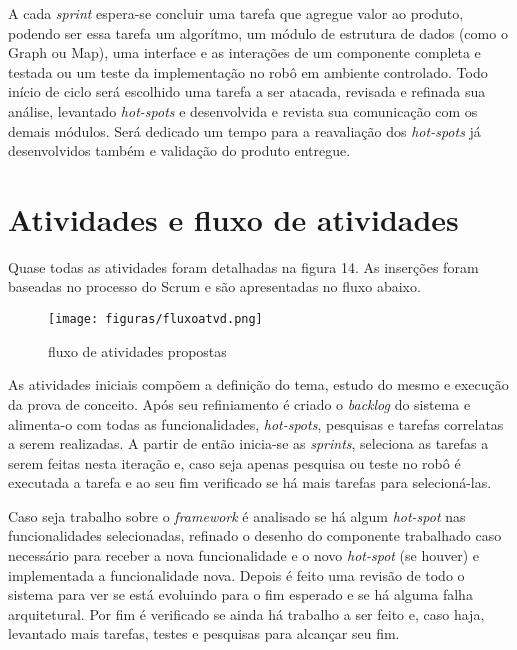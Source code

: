 A cada \textit{sprint} espera-se concluir uma tarefa que agregue valor ao produto, podendo ser essa tarefa um algorítmo, um módulo de estrutura de dados (como o Graph ou Map), uma interface e as interações de um componente completa e testada ou um teste da implementação no robô em ambiente controlado. Todo início de ciclo será escolhido uma tarefa a ser atacada, revisada e refinada sua análise, levantado \textit{hot-spots} e desenvolvida e revista sua comunicação com os demais módulos. Será dedicado um tempo para a reavaliação dos \textit{hot-spots} já desenvolvidos também e validação do produto entregue.

\section{Atividades e fluxo de atividades}

Quase todas as atividades foram detalhadas na figura 14. As inserções foram baseadas no processo do Scrum e são apresentadas no fluxo abaixo.

\begin{figure}[h]
	\centering
	\label{fig28}
		\texttt{[image: figuras/fluxoatvd.png]}
	\caption{fluxo de atividades propostas}
\end{figure}

As atividades iniciais compõem a definição do tema, estudo do mesmo e execução da prova de conceito. Após seu refiniamento é criado o \textit{backlog} do sistema e alimenta-o com todas as funcionalidades, \textit{hot-spots}, pesquisas e tarefas correlatas a serem realizadas. A partir de então inicia-se as \textit{sprints}, seleciona as tarefas a serem feitas nesta iteração e, caso seja apenas pesquisa ou teste no robô é executada a tarefa e ao seu fim verificado se há mais tarefas para selecioná-las.

Caso seja trabalho sobre o \textit{framework} é analisado se há algum \textit{hot-spot} nas funcionalidades selecionadas, refinado o desenho do componente trabalhado caso necessário para receber a nova funcionalidade e o novo \textit{hot-spot} (se houver) e implementada a funcionalidade nova. Depois é feito uma revisão de todo o sistema para ver se está evoluindo para o fim esperado e se há alguma falha arquitetural. Por fim é verificado se ainda há trabalho a ser feito e, caso haja, levantado mais tarefas, testes e pesquisas para alcançar seu fim.
